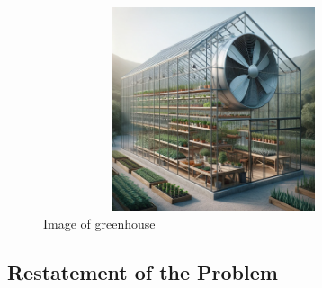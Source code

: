 \documentclass{apmcmthesis}
\begin{document}
\begin{figure}[htbp]
  \centering
  \includegraphics[width=10cm,height=6cm]{figures/GreenHouse.png}
  \caption{Image of greenhouse}
  \label{Image of greenhouse}
\end{figure}

\subsection{Restatement of the Problem}
\end{document}
